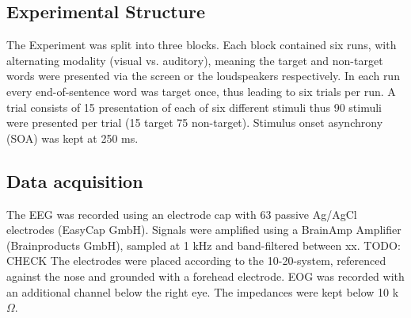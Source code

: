 \documentclass[10pt,letterpaper]{article}
\begin{document}
\subsection{Experimental Structure}
The Experiment was split into three blocks.
Each block contained six runs, with alternating modality (visual vs. auditory), meaning the target and non-target words were presented via the screen or the loudspeakers respectively.
In each run every end-of-sentence word was target once, thus leading to six trials per run.
A trial consists of 15 presentation of each of six different stimuli thus 90 stimuli were presented per trial (15 target 75 non-target).
Stimulus onset asynchrony (SOA) was kept at 250 ms.

\subsection{Data acquisition}
The EEG was recorded using an electrode cap with 63 passive Ag/AgCl electrodes (EasyCap GmbH).
Signals were amplified using a BrainAmp Amplifier (Brainproducts GmbH), sampled at 1 kHz and band-filtered between xx. TODO: CHECK
The electrodes were placed according to the 10-20-system, referenced against the nose and grounded with a forehead electrode.
EOG was recorded with an additional channel below the right eye.
The impedances were kept below 10 k$\Omega$.




\setlength{\bibleftmargin}{.125in}
\setlength{\bibindent}{-\bibleftmargin}


\end{document}
